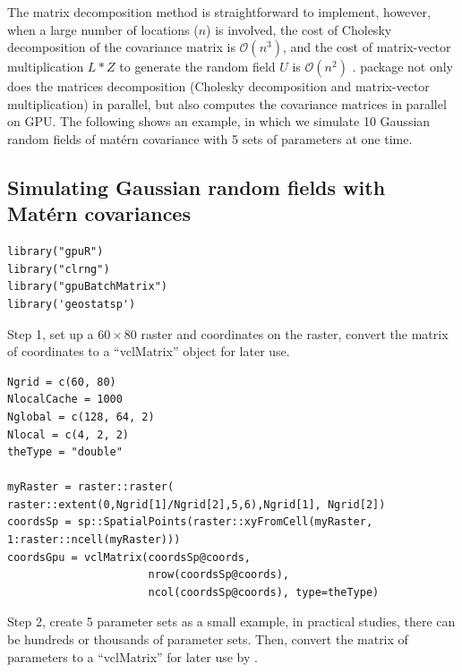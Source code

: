 \documentclass[article,nojss]{jss}\usepackage[]{graphicx}\usepackage[]{color}
\makeatletter
\newenvironment{kframe}{%
 \def\at@end@of@kframe{}%
 \ifinner\ifhmode%
  \def\at@end@of@kframe{\end{minipage}}%
  \begin{minipage}{\columnwidth}%
 \fi\fi%
 \def\FrameCommand##1{\hskip\@totalleftmargin \hskip-\fboxsep
 \colorbox{shadecolor}{##1}\hskip-\fboxsep
     \hskip-\linewidth \hskip-\@totalleftmargin \hskip\columnwidth}%
 \MakeFramed {\advance\hsize-\width
   \@totalleftmargin\z@ \linewidth\hsize
   \@setminipage}}%
 {\par\unskip\endMakeFramed%
 \at@end@of@kframe}
\newenvironment{knitrout}{}{} %
\newcommand{\fct}[1]{\code{#1()}}
\makeatother
\begin{document}
The matrix decomposition method is straightforward to implement, however, when a large number of locations ($n$) is involved, the cost of Cholesky decomposition of the covariance matrix is $\mathcal{O}(n^3)$,  and the cost of matrix-vector multiplication $L*Z$ to generate the random field $U$ is $\mathcal{O}(n^2)$ \citep{LiuandLi2019}.   package not only does the matrices decomposition (Cholesky decomposition and matrix-vector multiplication) in parallel, but also computes the covariance matrices in parallel on GPU. The following shows an example, in which we simulate 10 Gaussian random fields of mat\'ern covariance with 5 sets of parameters at one time. %

\subsection{Simulating Gaussian random fields with Mat\'ern covariances}
\begin{knitrout}
\color{fgcolor}\begin{kframe}
\begin{verbatim}
library("gpuR")
library("clrng")
library("gpuBatchMatrix")
library('geostatsp')
\end{verbatim}
\end{kframe}
\end{knitrout}
Step 1, set up a $60 \times 80$ raster and coordinates on the raster, convert the matrix of coordinates  to a ``vclMatrix'' object for later use.
\begin{knitrout}
\color{fgcolor}\begin{kframe}
\begin{verbatim}
Ngrid = c(60, 80)
NlocalCache = 1000
Nglobal = c(128, 64, 2)
Nlocal = c(4, 2, 2)
theType = "double"

myRaster = raster::raster( raster::extent(0,Ngrid[1]/Ngrid[2],5,6),Ngrid[1], Ngrid[2])
coordsSp = sp::SpatialPoints(raster::xyFromCell(myRaster, 1:raster::ncell(myRaster)))
coordsGpu = vclMatrix(coordsSp@coords, 
                      nrow(coordsSp@coords), 
                      ncol(coordsSp@coords), type=theType)
\end{verbatim}
\end{kframe}
\end{knitrout}
Step 2, create 5 parameter sets as a small example, in practical studies, there can be hundreds or thousands of parameter sets. Then, convert the matrix of parameters to a ``vclMatrix'' for later use by \fct{gpuBatchMatrix::maternGpuParam}.
\end{document}
